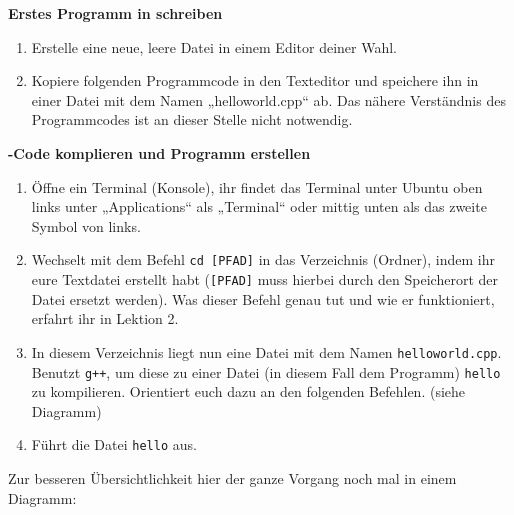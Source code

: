 \begin{praxis}

	\textbf{Erstes Programm in \Cpp schreiben}

	\begin{enumerate}
		\item Erstelle eine neue, leere Datei in einem Editor deiner Wahl.

		\item Kopiere folgenden Programmcode in den Texteditor und speichere ihn in einer Datei mit dem Namen „helloworld.cpp“ ab.
		      Das nähere Verständnis des Programmcodes ist an dieser Stelle nicht notwendig.
	\end{enumerate}


	\textbf{\Cpp-Code komplieren und Programm erstellen }

	\begin{enumerate}
		\item Öffne ein Terminal (Konsole), ihr findet das Terminal unter Ubuntu oben links unter „Applications“ als „Terminal“ oder mittig unten als das zweite Symbol von links.
		\item Wechselt mit dem Befehl \texttt{cd [PFAD]} in das Verzeichnis (Ordner), indem ihr eure Textdatei erstellt habt (\texttt{[PFAD]} muss hierbei durch den Speicherort der Datei ersetzt werden).
		      Was dieser Befehl genau tut und wie er funktioniert, erfahrt ihr in Lektion 2.
		\item In diesem Verzeichnis liegt nun eine Datei mit dem Namen \texttt{helloworld.cpp}.
		      Benutzt \texttt{g++}, um diese zu einer Datei (in diesem Fall dem Programm) \texttt{hello} zu
		      kompilieren. Orientiert euch dazu an den folgenden Befehlen. (siehe Diagramm)
		\item Führt die Datei \texttt{hello} aus.
	\end{enumerate}
\end{praxis}


Zur besseren Übersichtlichkeit hier der ganze Vorgang noch mal in einem
Diagramm:

\begin{center}
\end{center}

